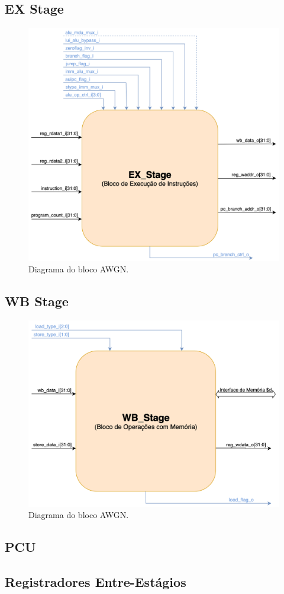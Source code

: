 \subsection{EX Stage}
\clearpage
\begin{figure}[!htb]
  \caption{Diagrama do bloco AWGN.}
  \vspace{0.2cm}
  \includegraphics[width=\linewidth]{images/EX_Stage(BLOCK).png}
\end{figure}

\subsection{WB Stage}
\clearpage
\begin{figure}[!htb]
  \caption{Diagrama do bloco AWGN.}
  \vspace{0.2cm}
  \includegraphics[width=\linewidth]{images/WB_Stage(BLOCK).png}
\end{figure}

\subsection{PCU}


\subsection{Registradores Entre-Estágios}
